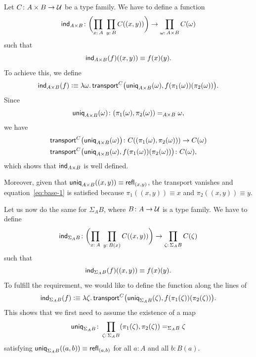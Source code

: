 \begin{solution}
    Let $C\colon A\times B\to\univ$ be a type family. We have to define a function
    \[
        \fun{ind}_{A\times B}\colon
            \biggl(
                \prod_{x\colon A}\;\prod_{y\colon B}C((x,y))
            \biggr)
            \to\prod_{\omega\colon A\times B}C(\omega)
    \]
    such that
    \begin{equation}\label{eq:base-1}
        \mathsf{ind}_{A\times B}(f)((x,y))\equiv f(x)(y).
    \end{equation}
    To achieve this, we define
    \[
        \mathsf{ind}_{A\times B}(f)\mathrel{\vcentcolon}\equiv\lambda\omega.\,
            \mathsf{transport}^C
            \bigl(
                \mathsf{uniq}_{A\times B}(\omega),
                f(\pi_1(\omega))(\pi_2(\omega))
            \bigr).
    \]
    Since
    \[
        \fun{uniq}_{A\times B}(\omega)\colon
            (\pi_1(\omega),\pi_2(\omega))
            \eq{A\times B}
            \omega,
    \]
    we have
    \begin{align*}
        \fun{transport}^C
            &\bigl(
                \fun{uniq}_{A\times B}(\omega)
            \bigr)\colon
                C((\pi_1(\omega),\pi_2(\omega)))
            \to C(\omega)\\
        \fun{transport}^C
            &\bigl(
                \fun{uniq}_{A\times B}(\omega),
                f(\pi_1(\omega))(\pi_2(\omega))
            \bigr)
            \colon C(\omega),
    \end{align*}
    which shows that $\mathsf{ind}_{A\times B}$ is well defined.
    
    Moreover, given that $\mathsf{uniq}_{A\times B}((x,y))\equiv\mathsf{refl}_{(x,y)}$, the transport vanishes and equation~\eqref{eq:base-1} is satisfied because $\pi_1((x,y))\equiv x$ and $\pi_2((x,y))\equiv y$.

    Let us now do the same for $\Sigma_AB$, where $B\colon A\to\univ$ is a type family. We have to define
    \[
        \fun{ind}_{\Sigma_AB}\colon
            \biggl(
                \prod_{x\colon A}\;\prod_{y\colon B(x)}C((x,y))
            \biggr)
            \to
            \prod_{\zeta\colon\Sigma_AB}C(\zeta)
    \]
    such that
    \begin{equation}\label{eq:base-2}
        \mathsf{ind}_{\Sigma_AB}(f)((x,y))\equiv f(x)(y).
    \end{equation}
    To fulfill the requirement, we would like to define the function along the lines of
    \[
        \mathsf{ind}_{\Sigma_AB}(f)
            \mathrel{\vcentcolon}\equiv\lambda\zeta.\,
            \mathsf{transport}^C
                \bigl(
                    \mathsf{uniq}_{\Sigma_AB}(\zeta),
                    f(\pi_1(\zeta))(\pi_2(\zeta))
                \bigr).
    \]
    This shows that we first need to assume the existence of a map
    \[
        \fun{uniq}_{\Sigma_AB}
            \colon\prod_{\zeta\colon\Sigma_AB}
            (\pi_1(\zeta),\pi_2(\zeta))
            \eq{\Sigma_AB}\zeta
    \]
    satisfying $\mathsf{uniq}_{\Sigma_AB}((a,b))\equiv\mathsf{refl}_{(a,b)}$ for all $a\colon A$ and all $b\colon B(a)$.
    

\end{solution}
